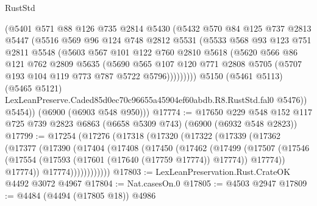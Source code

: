\begin{lexlean}{RustStd}
\begin{coremodule}
                (@5401
                  @571
                  @88
                  @126
                  @735
                  @2814
                  @5430
                  (@5432
                    @570
                    @84
                    @125
                    @737
                    @2813
                    @5447
                    (@5516
                      @569
                      @96
                      @124
                      @748
                      @2812
                      @5531
                      (@5533
                        @568
                        @93
                        @123
                        @751
                        @2811
                        @5548
                        (@5603
                          @567
                          @101
                          @122
                          @760
                          @2810
                          @5618
                          (@5620
                            @566
                            @86
                            @121
                            @762
                            @2809
                            @5635
                            (@5690
                              @565
                              @107
                              @120
                              @771
                              @2808
                              @5705
                              (@5707 @193 @104 @119 @773 @787 @5722 @5796)))))))))
              @5150
              (@5461 @5113)
              (@5465 @5121)
              LexLeanPreserve.Caded85d0ec70c96655a45904ef60abdb.R8.RustStd.fal0
              @5476))
          @5454))
      (@6900 (@6903 @548 @950)))
@17774 := @17650
    @229
    @548
    @152
    @117
    @725
    @739
    @2823
    @6863
    (@6658 @5309 @743)
    (@6900 (@6932 @548 @2823))
@17799 := @17254
    (@17276
      (@17318
        (@17320
          (@17322
            (@17339
              (@17362
                (@17377
                  (@17390
                    (@17404
                      (@17408
                        (@17450
                          (@17462
                            (@17499
                              (@17507
                                (@17546
                                  (@17554 (@17593 (@17601 (@17640 (@17759 @17774)) @17774)) @17774))
                                @17774))
                            @17774))))))))))))
@17803 := LexLeanPreservation.Rust.CrateOK @4492 @3072 @4967
@17804 := Nat.casesOn.{0}
@17805 := @4503 @2947
@17809 := @4484 (@4494 (@17805 @18)) @4986

\end{coremodule}
\end{lexlean}
